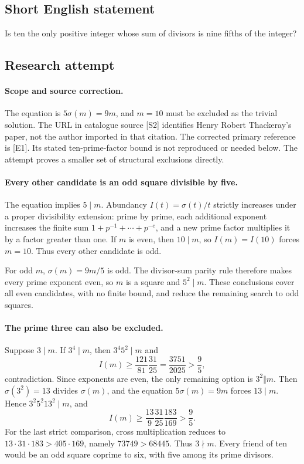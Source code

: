 \documentclass[11pt,a4paper]{article}
\begin{document}
\subsection{Short English statement}

Is ten the only positive integer whose sum of divisors is nine fifths of the integer?

\subsection{Research attempt}

\paragraph{Scope and source correction.}
The equation is $5\sigma(m)=9m$, and $m=10$ must be excluded as the
trivial solution. The URL in catalogue source [S2] identifies Henry
Robert Thackeray's paper, not the author imported in that citation.
The corrected primary reference is [E1]. Its stated ten-prime-factor
bound is not reproduced or needed below. The attempt proves a smaller
set of structural exclusions directly.

\paragraph{Every other candidate is an odd square divisible by five.}
The equation implies $5\mid m$. Abundancy $I(t)=\sigma(t)/t$ strictly
increases under a proper divisibility extension: prime by prime, each
additional exponent increases the finite sum $1+p^{-1}+\cdots+p^{-e}$,
and a new prime factor multiplies it by a factor greater than one.
If $m$ is even, then $10\mid m$, so $I(m)=I(10)$ forces $m=10$.
Thus every other candidate is odd.

For odd $m$, $\sigma(m)=9m/5$ is odd. The divisor-sum parity rule
therefore makes every prime exponent even, so $m$ is a square and
$5^2\mid m$. These conclusions cover all even candidates, with no
finite bound, and reduce the remaining search to odd squares.

\paragraph{The prime three can also be excluded.}
Suppose $3\mid m$. If $3^4\mid m$, then $3^4 5^2\mid m$ and
\[
 I(m)\ge\frac{121}{81}\frac{31}{25}
        =\frac{3751}{2025}>\frac95,
\]
contradiction. Since exponents are even, the only remaining option is
$3^2\Vert m$. Then $\sigma(3^2)=13$ divides $\sigma(m)$, and the
equation $5\sigma(m)=9m$ forces $13\mid m$. Hence
$3^2 5^2 13^2\mid m$, and
\[
 I(m)\ge\frac{13}{9}\frac{31}{25}\frac{183}{169}
        >\frac95.
\]
For the last strict comparison, cross multiplication reduces to
$13\cdot31\cdot183>405\cdot169$, namely $73749>68445$.
Thus $3\nmid m$. Every friend of ten would be an odd square coprime
to six, with five among its prime divisors.
\end{document}
